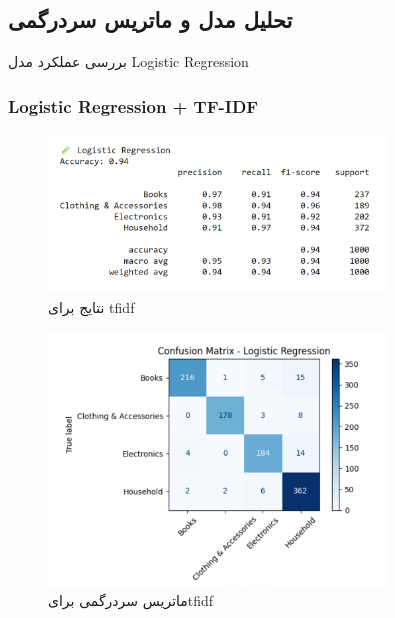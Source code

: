 \documentclass[a4paper,12pt]{article}
\begin{document}
\subsection{ تحلیل مدل و ماتریس سردرگمی}

بررسی عملکرد مدل Logistic Regression

\subsubsection*{Logistic Regression + TF-IDF}
\begin{figure}[H]
    \centering
    \includegraphics[width=0.8\textwidth]{lrTfidf.png}
    \caption*{نتایج برای tfidf}
    \label{fig:yourlabel}
\end{figure}
\begin{figure}[H]
    \centering
    \includegraphics[width=0.8\textwidth]{tfidfConfusionMatrix.png}
    \caption*{ماتریس سردرگمی برایtfidf }
    \label{fig:yourlabel}
\end{figure}
\end{document}
